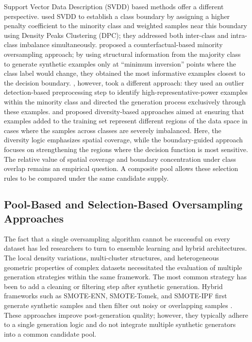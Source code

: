 \documentclass[pdflatex]{sn-jnl}
\begin{document}
Support Vector Data Description (SVDD) based methods offer a different perspective. \cite{ref12} used SVDD to establish a class boundary by assigning a higher penalty coefficient to the minority class and weighted samples near this boundary using Density Peaks Clustering (DPC); they addressed both inter-class and intra-class imbalance simultaneously. \cite{ref11} proposed a counterfactual-based minority oversampling approach; by using structural information from the majority class to generate synthetic examples only at ``minimum inversion'' points where the class label would change, they obtained the most informative examples closest to the decision boundary. \cite{ref32}, however, took a different approach: they used an outlier detection-based preprocessing step to identify high-representative-power examples within the minority class and directed the generation process exclusively through these examples. \cite{ref33} and \cite{ref34} proposed diversity-based approaches aimed at ensuring that examples added to the training set represent different regions of the data space in cases where the samples across classes are severely imbalanced. Here, the diversity logic emphasizes spatial coverage, while the boundary-guided approach focuses on strengthening the regions where the decision function is most sensitive. The relative value of spatial coverage and boundary concentration under class overlap remains an empirical question. A composite pool allows these selection rules to be compared under the same candidate supply.

\subsection{Pool-Based and Selection-Based Oversampling Approaches}

The fact that a single oversampling algorithm cannot be successful on every dataset \cite{ref15} has led researchers to turn to ensemble learning and hybrid architectures. The local density variations, multi-cluster structures, and heterogeneous geometric properties of complex datasets \cite{ref01} necessitated the evaluation of multiple generation strategies within the same framework. The most common strategy has been to add a cleaning or filtering step after synthetic generation. Hybrid frameworks such as SMOTE-ENN, SMOTE-Tomek, and SMOTE-IPF first generate synthetic samples and then filter out noisy or overlapping samples \cite{ref35} \cite{ref36}. These approaches improve post-generation quality; however, they typically adhere to a single generation logic and do not integrate multiple synthetic generators into a common candidate pool.
\end{document}
